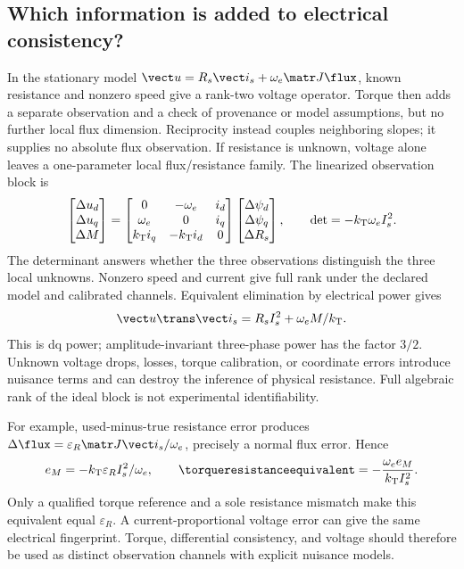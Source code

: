 \subsection{Which information is added to electrical consistency?}
\label{sec:combined-torque-information}
In the stationary model $\vect u=R_s\vect i_s+\omega_e\matr J\flux$,
known resistance and nonzero speed give a rank-two voltage operator.
Torque then adds a separate observation and a check of provenance or
model assumptions, but no further local flux dimension. Reciprocity instead
couples neighboring slopes; it supplies no absolute flux observation.
If resistance is unknown, voltage alone leaves a one-parameter local
flux/resistance family. The linearized observation block is
\begin{equation}
 \begin{bmatrix}\Delta u_d\\\Delta u_q\\\Delta M\end{bmatrix}
 =
 \begin{bmatrix}
 0&-\omega_e&i_d\\
 \omega_e&0&i_q\\
 k_{\rm T}i_q&-k_{\rm T}i_d&0
 \end{bmatrix}
 \begin{bmatrix}\Delta\psi_d\\\Delta\psi_q\\\Delta R_s\end{bmatrix},
 \qquad \det=-k_{\rm T}\omega_e I_s^2 .
 \label{eq:joint-torque-voltage-rank}
\end{equation}
The determinant answers whether the three observations distinguish the
three local unknowns. Nonzero speed and current give full rank under the
declared model and calibrated channels. Equivalent elimination by
electrical power gives
\begin{equation}
 \vect u\trans\vect i_s=R_s I_s^2+\omega_e M/k_{\rm T}.
 \label{eq:torque-power-information}
\end{equation}
This is dq power; amplitude-invariant three-phase power has the factor $3/2$.
Unknown voltage drops, losses, torque calibration, or coordinate errors
introduce nuisance terms and can destroy the inference of physical resistance.
Full algebraic rank of the ideal block is not experimental identifiability.

For example, used-minus-true resistance error produces
$\Delta\flux=\varepsilon_R\matr J\vect i_s/\omega_e$, precisely a
normal flux error. Hence
\begin{equation}
 e_M=-k_{\rm T}\varepsilon_R I_s^2/\omega_e,\qquad
 \torqueresistanceequivalent=-\frac{\omega_e e_M}{k_{\rm T}I_s^2}.
 \label{eq:torque-resistance-equivalent}
\end{equation}
Only a qualified torque reference and a sole resistance mismatch make
this equivalent equal $\varepsilon_R$. A current-proportional voltage
error can give the same electrical fingerprint. Torque, differential
consistency, and voltage should therefore be used as distinct observation
channels with explicit nuisance models.

